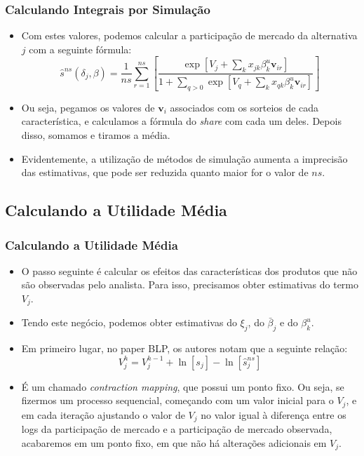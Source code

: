 \documentclass{beamer}
\begin{document}
\begin{frame}\frametitle{Calculando Integrais por Simulação}

\begin{itemize}
\item Com estes valores, podemos calcular a participação de mercado da alternativa
$j$ com a seguinte fórmula:
\[
\hat{s}^{ns}(\delta_{j},\beta)=\frac{1}{ns}\sum_{r=1}^{ns}\left[\frac{\exp[V_{j}+\sum_{k}x_{jk}\beta_{k}^{u}\mathbf{v}_{ir}]}{1+\sum_{q>0}\exp[V_{q}+\sum_{k}x_{qk}\beta_{k}^{u}\mathbf{v}_{ir}]}\right]
\]
\item Ou seja, pegamos os valores de $\mathbf{v}_{i}$ associados com os
sorteios de cada característica, e calculamos a fórmula do \emph{share}
com cada um deles. Depois disso, somamos e tiramos a média. 
\item Evidentemente, a utilização de métodos de simulação aumenta a imprecisão
das estimativas, que pode ser reduzida quanto maior for o valor de
$ns$. 
\end{itemize}
\end{frame}

\subsection{Calculando a Utilidade Média}
\begin{frame}\frametitle{Calculando a Utilidade Média}

\begin{itemize}
\item O passo seguinte é calcular os efeitos das características dos produtos
que não são observadas pelo analista. Para isso, precisamos obter
estimativas do termo $V_{j}$. 
\item Tendo este negócio, podemos obter estimativas do $\xi_{j}$, do $\bar{\beta}_{j}$
e do $\beta_{k}^{u}$. 
\item Em primeiro lugar, no paper BLP, os autores notam que a seguinte relação:
\[
V_{j}^{h}=V_{j}^{h-1}+\ln[s_{j}]-\ln[\hat{s}_{j}^{ns}]
\]
\item É um chamado \emph{contraction mapping}, que possui um ponto fixo.
Ou seja, se fizermos um processo sequencial, começando com um valor
inicial para o $V_{j}$, e em cada iteração ajustando o valor de $V_{j}$
no valor igual à diferença entre os logs da participação de mercado
e a participação de mercado observada, acabaremos em um ponto fixo,
em que não há alterações adicionais em $V_{j}$. 
\end{itemize}
\end{frame}
\end{document}
